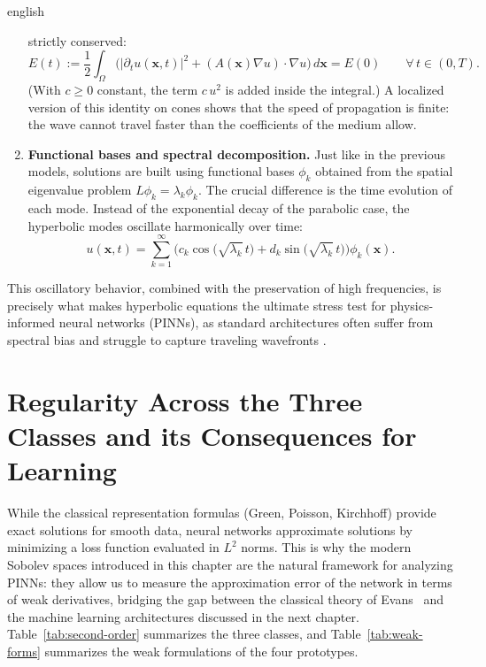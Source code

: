 \documentclass[11pt,letterpaper,twoside,openright]{book} %
\newcommand{\abs}[1]{\left\lvert #1 \right\rvert}
\begin{document}
\begin{hyphenrules}{english}
\begin{enumerate}
    strictly conserved:
    \begin{equation}
      E(t):=\frac12\int_\Omega\Big(\abs{\partial_t u(\mathbf{x},t)}^2+(A(\mathbf{x})\nabla u)\cdot\nabla u\Big)\,d\mathbf{x}=E(0)
      \qquad\forall\,t\in(0,T).
      \label{eq:energy-conservation}
    \end{equation}
    (With $c\ge0$ constant, the term $c\,u^2$ is added inside the integral.) A localized version of
    this identity on cones shows that the speed of propagation is finite: the wave cannot travel faster
    than the coefficients of the medium allow.
  \item \textbf{Functional bases and spectral decomposition.} Just like in the previous models,
    solutions are built using functional bases $\phi_k$ obtained from the spatial eigenvalue problem
    $L\phi_k=\lambda_k\phi_k$. The crucial difference is the time evolution of each mode. Instead of
    the exponential decay of the parabolic case, the hyperbolic modes oscillate harmonically over time:
    \begin{equation}
      u(\mathbf{x},t)=\sum_{k=1}^{\infty}\Big(c_k\cos\big(\sqrt{\lambda_k}\,t\big)+d_k\sin\big(\sqrt{\lambda_k}\,t\big)\Big)\phi_k(\mathbf{x}).
      \label{eq:hyperbolic-modes}
    \end{equation}
\end{enumerate}
This oscillatory behavior, combined with the preservation of high frequencies, is precisely what makes
hyperbolic equations the ultimate stress test for physics-informed neural networks (PINNs), as standard
architectures often suffer from spectral bias and struggle to capture traveling wavefronts
\cite{wang2021eigenvector,wang2022ntk}.

\section[Regularity and its Consequences for Learning]{Regularity Across the Three Classes and its Consequences for Learning}\label{sec:regularity-bridge}

While the classical representation formulas (Green, Poisson, Kirchhoff) provide exact solutions for
smooth data, neural networks approximate solutions by minimizing a loss function evaluated in $L^2$
norms. This is why the modern Sobolev spaces introduced in this chapter are the natural framework for
analyzing PINNs: they allow us to measure the approximation error of the network in terms of weak
derivatives, bridging the gap between the classical theory of Evans~\cite{evans2010} and the machine
learning architectures discussed in the next chapter. Table~\ref{tab:second-order} summarizes the three
classes, and Table~\ref{tab:weak-forms} summarizes the weak formulations of the four prototypes.


\end{hyphenrules}
\end{document}
